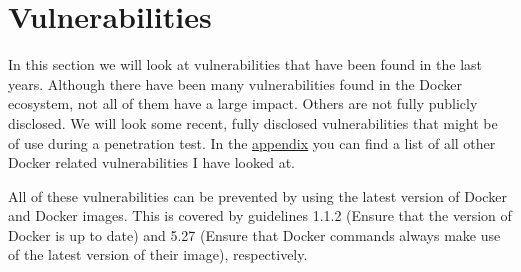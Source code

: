 \section{Vulnerabilities}
In this section we will look at vulnerabilities that have been found in the last years. Although there have been many vulnerabilities found in the Docker ecosystem, not all of them have a large impact. Others are not fully publicly disclosed. We will look some recent, fully disclosed vulnerabilities that might be of use during a penetration test. In the \hyperref[appendix:CVE-List]{appendix} you can find a list of all other Docker related vulnerabilities I have looked at.

\hfill

All of these vulnerabilities can be prevented by using the latest version of Docker and Docker images. This is covered by guidelines 1.1.2 (Ensure that the version of Docker is up to date) and 5.27 (Ensure that Docker commands always make use of the latest version of their image), respectively.








